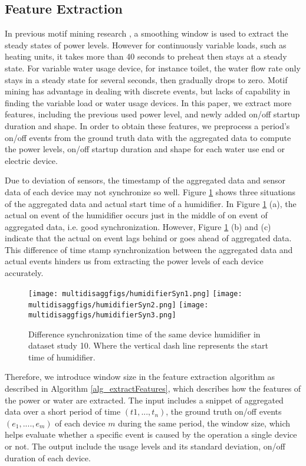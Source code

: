 \subsection{Feature Extraction}
In previous motif mining research \cite{shao2013temporal}, 
a smoothing window is used to extract the steady states of power levels.
However for continuously variable loads, such as heating units, 
it takes more than 40 seconds to preheat then stays at 
a steady state.  
For variable water usage device, for instance toilet, 
the water flow rate only stays in a steady state for several seconds, 
then gradually drops to zero. 
Motif mining has advantage in dealing with discrete events, but 
lacks of capability in finding the variable load or water usage devices. 
In this paper, we extract more features, including the previous used 
power level, and newly added on/off startup duration and shape. 
In order to obtain these features, 
we preprocess a period's on/off events from the ground truth data with the aggregated data 
to compute the power levels, on/off startup duration and shape for 
each water use end or electric device.
 
Due to deviation of sensors, the timestamp of the aggregated data and
sensor data of each device may not synchronize so well. 
Figure \ref{fig_humidifierSyn} shows three situations of
the aggregated data and actual start time of a humidifier. 
In Figure \ref{fig_humidifierSyn} (a), 
the actual on event of the humidifier occurs just in the middle of on
event of aggregated data, i.e. good synchronization.
However, Figure \ref{fig_humidifierSyn} (b) and (c) indicate that the
actual on event lags behind or goes ahead of aggregated data. 
This difference of time stamp synchronization between 
the aggregated data and actual events 
hinders us from extracting the power levels of each device accurately.
\begin{figure}[!t]
\centering
\texttt{[image: multidisaggfigs/humidifierSyn1.png]}
\texttt{[image: multidisaggfigs/humidifierSyn2.png]}
\texttt{[image: multidisaggfigs/humidifierSyn3.png]}
\caption{Difference synchronization time of the same device humidifier in dataset study 10. Where the vertical dash line represents the start time of humidifier.}
\label{fig_humidifierSyn}
\end{figure}

Therefore, we introduce window size in the feature extraction algorithm as described 
in Algorithm \ref{alg_extractFeatures}, which describes how the features of 
the power or water are extracted.
The input includes a snippet of aggregated data over a short period of time $(t1,..., t_n)$, the ground truth on/off events $(e_1, ...., e_m)$ of each device $m$ during the same period, 
the window size, which helps evaluate whether a specific event is 
caused by the operation a single device or not. 
The output include the usage levels and its standard deviation, 
on/off duration of each device. 

